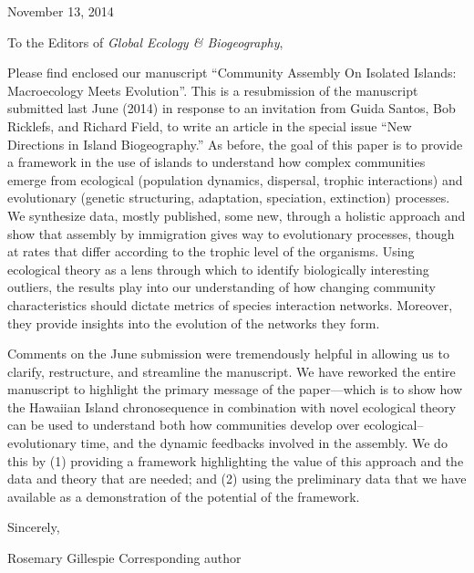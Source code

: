 \documentclass[12pt]{article}
\begin{document}
\noindent
November 13, 2014
\vspace{2em}

\noindent
To the Editors of {\it Global Ecology \& Biogeography},

Please find enclosed our manuscript ``Community Assembly On Isolated
Islands:  Macroecology Meets Evolution''. This is a resubmission of the
manuscript submitted last June (2014) in response to an invitation
from Guida Santos, Bob Ricklefs, and Richard Field, to write an
article in the special issue ``New Directions in Island Biogeography.''
As before, the goal of this paper is to provide a framework in the use
of islands to understand how complex communities emerge from
ecological (population dynamics, dispersal, trophic interactions) and
evolutionary (genetic structuring, adaptation, speciation, extinction)
processes.  We synthesize data, mostly published, some new, through a
holistic approach and show that assembly by immigration gives way to
evolutionary processes, though at rates that differ according to the
trophic level of the organisms. Using ecological theory as a lens
through which to identify biologically interesting outliers, the
results play into our understanding of how changing community
characteristics should dictate metrics of species interaction
networks. Moreover, they provide insights into the evolution of the
networks they form.

Comments on the June submission were tremendously helpful in allowing
us to clarify, restructure, and streamline the manuscript. We have
reworked the entire manuscript to highlight the primary message of the
paper---which is to show how the Hawaiian Island chronosequence in
combination with novel ecological theory can be used to understand
both how communities develop over ecological--evolutionary time, and
the dynamic feedbacks involved in the assembly.  We do this by (1)
providing a framework highlighting the value of this approach and the
data and theory that are needed; and (2) using the preliminary data
that we have available as a demonstration of the potential of the
framework.

Sincerely,

Rosemary Gillespie
Corresponding author
\end{document}
